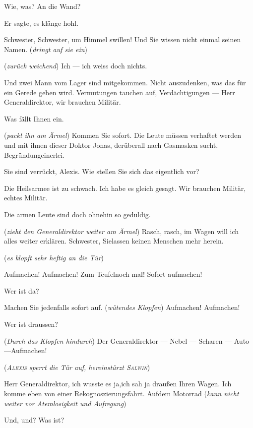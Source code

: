 \documentclass[
	final,
	a4paper,
	ngerman,
	mpinclude = true, %
	twoside = true,
	open = right,
	cleardoublepage = plain,
	DIV = 13,
	BCOR = 1cm,
	titlepage = firstiscover,
	]{scrbook}
\newcommand{\direction}[1]{(\textit{#1})}
\newcommand{\thecharacter}[1]{\textup{\textsc{#1}}\xspace}
\newcommand{\theAlexis}{\thecharacter{Alexis}}
\newcommand{\theSalwin}{\thecharacter{Salwin}}
\newcommand{\character}[1]{\item[#1]}
\newcommand{\Generaldirektor}{\character{Direktor}}
\newcommand{\Alexis}{\character{\theAlexis}}
\newcommand{\Salwin}{\character{\theSalwin}}
\newcommand{\Heilsarmeeschwester}{\character{Schwester}}
\newcommand{\Stimme}{\character{\emph{Stimme}}}
\begin{document}
\begin{play}
\Alexis
Wie, was? An die Wand?

\Heilsarmeeschwester
Er sagte, es klänge hohl.

\Alexis
Schwester, Schwester, um Himmel swillen! Und Sie wissen nicht einmal seinen Namen. \direction{dringt auf sie ein}

\Heilsarmeeschwester
\direction{zurück weichend} Ich --- ich weiss doch nichts.

\Alexis
Und zwei Mann vom Lager sind mitgekommen. Nicht auszudenken, was das für ein Gerede geben wird. Vermutungen tauchen auf, Verdächtigungen --- Herr Generaldirektor, wir brauchen Militär.

\Generaldirektor
Was fällt Ihnen ein.

\Alexis
\direction{packt ihn am Ärmel} Kommen Sie sofort. Die Leute müssen verhaftet werden und mit ihnen dieser Doktor Jonas, derüberall nach Gasmasken sucht. Begründungeinerlei.

\Generaldirektor
Sie sind verrückt, Alexis. Wie stellen Sie sich das eigentlich vor?

\Alexis
Die Heilsarmee ist zu schwach. Ich habe es gleich gesagt. Wir brauchen Militär, echtes Militär.

\Heilsarmeeschwester
Die armen Leute sind doch ohnehin so geduldig.

\Alexis
\direction{zieht den Generaldirektor weiter am Ärmel} Rasch, rasch, im Wagen will ich alles weiter erklären. Schwester, Sielassen keinen Menschen mehr herein.

\direction{es klopft sehr heftig an die Tür}

\Stimme
Aufmachen! Aufmachen! Zum Teufelnoch mal! Sofort aufmachen!

\Alexis
Wer ist da?

\Stimme
Machen Sie jedenfalls sofort auf. \direction{wütendes Klopfen} Aufmachen! Aufmachen!

\Alexis
Wer ist draussen?

\Stimme
\direction{Durch das Klopfen hindurch} Der Generaldirektor --- Nebel --- Scharen --- Auto ---Aufmachen!

\direction{\theAlexis sperrt die Tür auf, hereinstürzt \theSalwin}

\Salwin
Herr Generaldirektor, ich wusste es ja,ich sah ja draußen Ihren Wagen. Ich komme eben von einer Rekognoszierungsfahrt. Aufdem Motorrad \direction{kann nicht weiter vor Atemlosigkeit und Aufregung}

\Generaldirektor
Und, und? Was ist?


\end{play}
\end{document}
